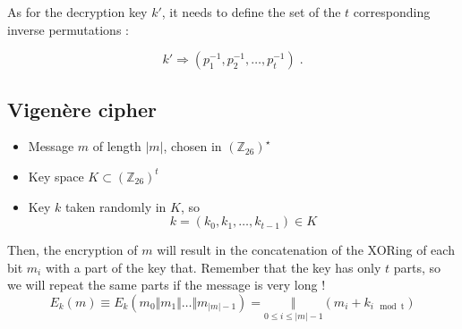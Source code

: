 \documentclass[a4paper, 12pt]{book}
\begin{document}
As for the decryption key $k'$, it needs to define the set of the $t$ corresponding inverse permutations :

$$k' \Rightarrow (p_1^{-1}, p_2^{-1}, \dots, p_t^{-1}) \; .$$

\subsection{Vigenère cipher} 
\begin{itemize}
    \item Message $m$ of length $|m|$, chosen in $(\mathbb{Z}_{26})^\star$
    \item Key space $K \subset (\mathbb{Z}_{26})^t$
    \item Key $k$ taken randomly in $K$, so 
    $$k = (k_0, k_1, \dots, k_{t-1}) \in K$$
\end{itemize}
Then, the encryption of $m$ will result in the concatenation of the XORing of each bit $m_i$ with a part of the key that. Remember that the key has only $t$ parts, so we will repeat the same parts if the message is very long !
$$E_k(m) \equiv E_k(m_0 \Vert m_1 \Vert \dots \Vert m_{|m|-1}) =  \underset{\scriptscriptstyle{0\leq i \leq |m|-1}}{\Vert} (m_i + k_{i  \mod{\mathrm{t}}})$$
\end{document}
